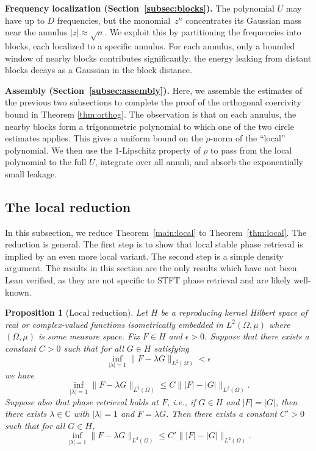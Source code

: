 \documentclass[11pt]{amsart}
\newtheorem{proposition}[theorem]{Proposition}
\theoremstyle{remark}
\begin{document}
\medskip
\noindent
\textbf{Frequency localization (Section~\ref{subsec:blocks}).}\; The polynomial $U$ may have up to $D$ frequencies, but the monomial~$z^n$
concentrates its Gaussian mass near the annulus $\lvert z \rvert \approx \sqrt{n}$.
We exploit this by partitioning the frequencies into blocks, each localized
to a specific annulus.  For each annulus, only a bounded window of nearby
blocks contributes significantly; the energy leaking from distant blocks
decays as a Gaussian in the block distance.

\medskip
\noindent
\textbf{Assembly (Section~\ref{subsec:assembly}).}\;
Here, we assemble the estimates of the previous two subsections to complete the proof of the orthogonal coercivity bound in Theorem \ref{thm:orthog}. The observation is that on each annulus, the nearby blocks form a trigonometric polynomial to which
one of the two circle estimates applies.  This gives a uniform bound on the
$\rho$-norm of the ``local'' polynomial.  We then use the $1$-Lipschitz
property of $\rho$ to pass from the local polynomial to the full $U$,
integrate over all annuli, and absorb the exponentially small leakage.

\subsection{The local reduction}\label{subsec:local-reduction}
In this subsection, we  reduce Theorem~\ref{main:local} to Theorem~\ref{thm:local}. The reduction is general. The first step is to show that local stable phase retrieval is implied by an
even more local variant. The second step is a simple density argument. The results in this section are the only results which have not been Lean verified, as they are not specific to STFT phase retrieval and are likely well-known.

\begin{proposition}[Local reduction]\label{prop:local-reduction}
Let \(H\) be a reproducing kernel Hilbert space of real or complex-valued
functions isometrically embedded in \(L^2(\Omega,\mu)\) where $(\Omega,\mu)$ is some measure space. Fix \(F\in H\) and
\(\epsilon>0\). Suppose that there exists a constant \(C>0\) such that for
all \(G\in H\) satisfying
\[
\inf_{\lvert \lambda \rvert=1}\lVert F-\lambda G \rVert_{L^2(\Omega)}<\epsilon
\]
we have
\[
\inf_{\lvert \lambda \rvert=1}\lVert F-\lambda G \rVert_{L^2(\Omega)}
\le
C\lVert \lvert F \rvert-\lvert G \rvert \rVert_{L^2(\Omega)}.
\]
Suppose also that phase retrieval holds at \(F\), i.e., if \(G\in H\) and
\(\lvert F \rvert=\lvert G \rvert\), then there exists \(\lambda\in\mathbb{C}\) with
\(\lvert \lambda \rvert=1\) and \(F=\lambda G\). Then there exists a constant
\(C'>0\) such that for all \(G\in H\),
\[
\inf_{\lvert \lambda \rvert=1}\lVert F-\lambda G \rVert_{L^2(\Omega)}
\le
C'\lVert \lvert F \rvert-\lvert G \rvert \rVert_{L^2(\Omega)}.
\]
\end{proposition}
\end{document}
